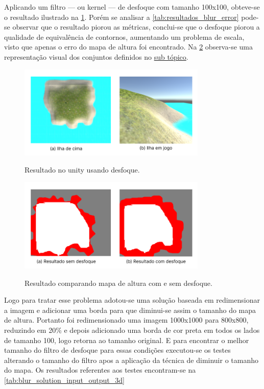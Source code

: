 Aplicando um filtro — ou kernel — de desfoque com tamanho 100x100, obteve-se o resultado ilustrado na \cref{fig:unity_blur}. Porém se analisar a \cref{tab:resultados_blur_error} pode-se observar que o resultado piorou as métricas, conclui-se que o desfoque piorou a qualidade de equivalência de contornos, aumentando um problema de escala, visto que apenas o erro do mapa de altura foi encontrado. Na \cref{fig:comparando_blur} observa-se uma representação visual dos conjuntos definidos no \hyperref[sec:classificacao_conjuntos]{sub tópico}.

\begin{figure}[!ht]
	\centering
    \caption{Resultado no unity usando desfoque.}
	\includegraphics[width=0.8\textwidth]{figures/unity_blur.png}
	\label{fig:unity_blur}
\end{figure}

\begin{figure}[!ht]
	\centering
    \caption{Resultado comparando mapa de altura com e sem desfoque.}
	\includegraphics[width=0.8\textwidth]{figures/comparacao_blur.png}
	\label{fig:comparando_blur}
\end{figure}



Logo para tratar esse problema adotou-se uma solução baseada em redimensionar a imagem e adicionar uma borda para que diminui-se assim o tamanho do mapa de altura. Portanto foi redimensionado uma imagem 1000x1000 para 800x800, reduzindo em 20\% e depois adicionado uma borda de cor preta em todos os lados de tamanho 100, logo retorna ao tamanho original. E para encontrar o melhor tamanho do filtro de desfoque para essas condições executou-se os testes alterando o tamanho do filtro apos a aplicação da técnica de diminuir o tamanho do mapa. Os resultados referentes aos testes encontram-se na \cref{tab:blur_solution_input_output_3d}

